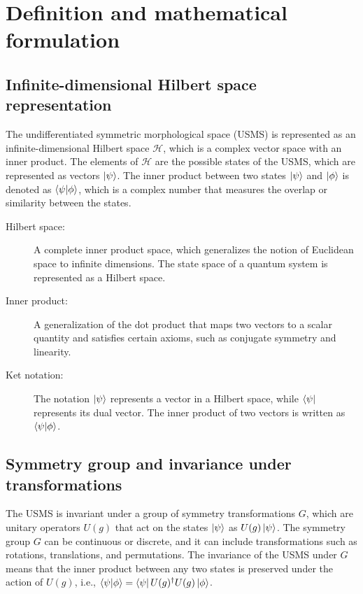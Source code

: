 \section{Definition and mathematical formulation}
\subsection{Infinite-dimensional Hilbert space representation}
The undifferentiated symmetric morphological space (USMS) is represented as an infinite-dimensional Hilbert space $\mathcal{H}$, which is a complex vector space with an inner product. The elements of $\mathcal{H}$ are the possible states of the USMS, which are represented as vectors $\ket{\psi}$. The inner product between two states $\ket{\psi}$ and $\ket{\phi}$ is denoted as $\braket{\psi|\phi}$, which is a complex number that measures the overlap or similarity between the states.

\begin{tcolorbox}[colback=blue!5!white,colframe=blue!75!black,title=New terms]
\begin{description}
\item[Hilbert space:] A complete inner product space, which generalizes the notion of Euclidean space to infinite dimensions. The state space of a quantum system is represented as a Hilbert space.
\item[Inner product:] A generalization of the dot product that maps two vectors to a scalar quantity and satisfies certain axioms, such as conjugate symmetry and linearity.
\item[Ket notation:] The notation $\ket{\psi}$ represents a vector in a Hilbert space, while $\bra{\psi}$ represents its dual vector. The inner product of two vectors is written as $\braket{\psi|\phi}$.
\end{description}
\end{tcolorbox}

\subsection{Symmetry group and invariance under transformations}
The USMS is invariant under a group of symmetry transformations $G$, which are unitary operators $U(g)$ that act on the states $\ket{\psi}$ as $U(g)\ket{\psi}$. The symmetry group $G$ can be continuous or discrete, and it can include transformations such as rotations, translations, and permutations. The invariance of the USMS under $G$ means that the inner product between any two states is preserved under the action of $U(g)$, i.e., $\braket{\psi|\phi} = \bra{\psi}U(g)^\dagger U(g)\ket{\phi}$.

